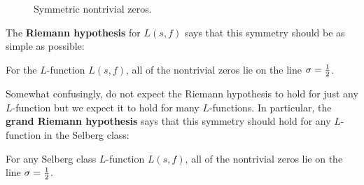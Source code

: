     \begin{figure}[ht]
      \centering
      \caption{Symmetric nontrivial zeros.}
      \label{fig:symmetric_nontrivial_zeros}
    \end{figure}

    The \textbf{Riemann hypothesis} for $L(s,f)$ says that this symmetry should be as simple as possible:

    \begin{conjecture*}
      For the $L$-function $L(s,f)$, all of the nontrivial zeros lie on the line $\sigma = \frac{1}{2}$.
    \end{conjecture*}

    Somewhat confusingly, do not expect the Riemann hypothesis to hold for just any $L$-function but we expect it to hold for many $L$-functions. In particular, the \textbf{grand Riemann hypothesis} says that this symmetry should hold for any $L$-function in the Selberg class:

    \begin{conjecture*}
      For any Selberg class $L$-function $L(s,f)$, all of the nontrivial zeros lie on the line $\sigma = \frac{1}{2}$.
    \end{conjecture*}

